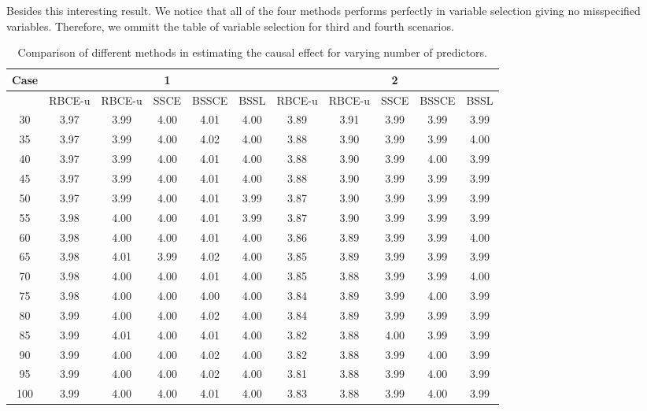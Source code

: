 \documentclass[preprint,12pt]{elsarticle}
\begin{document}
Besides this interesting result. We notice that all of the four methods performs
perfectly in variable selection giving no misspecified variables. Therefore,
we ommitt the table of variable selection for third and fourth scenarios.


\begin{table}[ht]
\centering
\tiny
\caption{Comparison of different methods in estimating the causal effect for varying number of predictors.}
\begin{tabular}{c|ccccc|ccccc}
  \hline
 Case&  &  & 1 &  &  &  &  & 2 &  &  \\ 
  \hline
 & RBCE-u & RBCE-u & SSCE & BSSCE & BSSL & RBCE-u & RBCE-u & SSCE & BSSCE & BSSL \\ 
  \hline
\hline
30 & 3.97 & 3.99 & 4.00 & 4.01 & 4.00 & 3.89 & 3.91 & 3.99 & 3.99 & 3.99 \\ 
  35 & 3.97 & 3.99 & 4.00 & 4.02 & 4.00 & 3.88 & 3.90 & 3.99 & 3.99 & 4.00 \\ 
  40 & 3.97 & 3.99 & 4.00 & 4.01 & 4.00 & 3.88 & 3.90 & 3.99 & 4.00 & 3.99 \\ 
  45 & 3.97 & 3.99 & 4.00 & 4.01 & 4.00 & 3.88 & 3.90 & 3.99 & 3.99 & 3.99 \\ 
  50 & 3.97 & 3.99 & 4.00 & 4.01 & 3.99 & 3.87 & 3.90 & 3.99 & 3.99 & 3.99 \\ 
  55 & 3.98 & 4.00 & 4.00 & 4.01 & 3.99 & 3.87 & 3.90 & 3.99 & 3.99 & 3.99 \\ 
  60 & 3.98 & 4.00 & 4.00 & 4.01 & 4.00 & 3.86 & 3.89 & 3.99 & 3.99 & 4.00 \\ 
  65 & 3.98 & 4.01 & 3.99 & 4.02 & 4.00 & 3.85 & 3.89 & 3.99 & 3.99 & 3.99 \\ 
  70 & 3.98 & 4.00 & 4.00 & 4.01 & 4.00 & 3.85 & 3.88 & 3.99 & 3.99 & 4.00 \\ 
  75 & 3.98 & 4.00 & 4.00 & 4.00 & 4.00 & 3.84 & 3.89 & 3.99 & 4.00 & 3.99 \\ 
  80 & 3.99 & 4.00 & 4.00 & 4.02 & 4.00 & 3.84 & 3.89 & 3.99 & 3.99 & 3.99 \\ 
  85 & 3.99 & 4.01 & 4.00 & 4.01 & 4.00 & 3.82 & 3.88 & 4.00 & 3.99 & 3.99 \\ 
  90 & 3.99 & 4.00 & 4.00 & 4.02 & 4.00 & 3.82 & 3.88 & 3.99 & 4.00 & 3.99 \\ 
  95 & 3.99 & 4.00 & 4.00 & 4.02 & 4.00 & 3.81 & 3.88 & 3.99 & 4.00 & 3.99 \\ 
  100 & 3.99 & 4.00 & 4.00 & 4.01 & 4.00 & 3.83 & 3.88 & 3.99 & 4.00 & 3.99 \\ 

\end{tabular}
\end{table}
\end{document}
